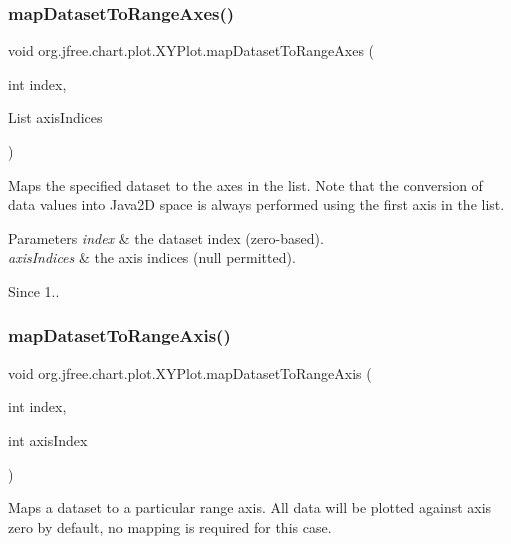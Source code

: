 \subsubsection{\texorpdfstring{map\+Dataset\+To\+Range\+Axes()}{mapDatasetToRangeAxes()}}
{\footnotesize\ttfamily void org.\+jfree.\+chart.\+plot.\+X\+Y\+Plot.\+map\+Dataset\+To\+Range\+Axes (\begin{DoxyParamCaption}\item[{int}]{index,  }\item[{List}]{axis\+Indices }\end{DoxyParamCaption})}

Maps the specified dataset to the axes in the list. Note that the conversion of data values into Java2D space is always performed using the first axis in the list.


\begin{DoxyParams}{Parameters}
{\em index} & the dataset index (zero-\/based). \\
\hline
{\em axis\+Indices} & the axis indices ({\ttfamily null} permitted).\\
\hline
\end{DoxyParams}
\begin{DoxySince}{Since}
1.. 
\end{DoxySince}
\mbox{\label{classorg_1_1jfree_1_1chart_1_1plot_1_1_x_y_plot_a0f3db6eea8441891a6ece35ecded8dd5}} 
\subsubsection{\texorpdfstring{map\+Dataset\+To\+Range\+Axis()}{mapDatasetToRangeAxis()}}
{\footnotesize\ttfamily void org.\+jfree.\+chart.\+plot.\+X\+Y\+Plot.\+map\+Dataset\+To\+Range\+Axis (\begin{DoxyParamCaption}\item[{int}]{index,  }\item[{int}]{axis\+Index }\end{DoxyParamCaption})}

Maps a dataset to a particular range axis. All data will be plotted against axis zero by default, no mapping is required for this case.


